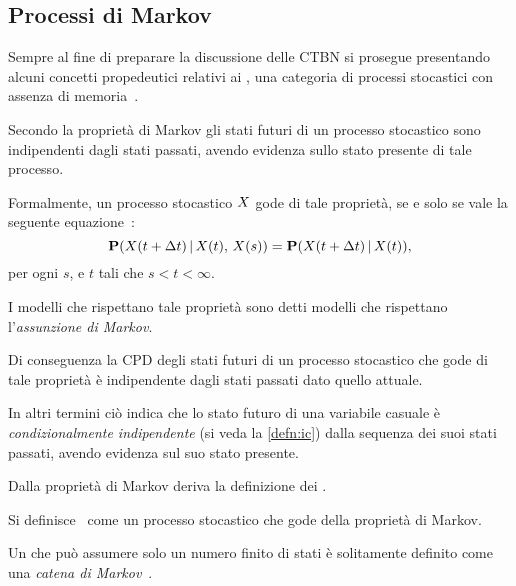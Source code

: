 \subsection{Processi di Markov}
\label{subsec:mps}

Sempre al fine di preparare la discussione delle \acl{CTBN} si prosegue presentando alcuni concetti propedeutici relativi ai \mprocess{}, una categoria di processi stocastici con assenza di memoria~\citep{Loeve1978}.

\begin{definizione}
\label{defn:markov-assumption}
Secondo la proprietà di Markov gli stati futuri di un processo stocastico sono indipendenti dagli stati passati, avendo evidenza sullo stato presente di tale processo.

Formalmente, un processo stocastico $\mathnormal{X}$ gode di tale proprietà, se e solo se vale la seguente equazione~\citep{Loeve1978}:
\begin{equation}
\label{eq:markov-assumption}
\mathbf{P}(\mathnormal{X}(t + \Delta t)\,\arrowvert\,\mathnormal{X}(t),\,\mathnormal{X}(s))=\mathbf{P}(\mathnormal{X}(t + \Delta t)\,\arrowvert\,\mathnormal{X}(t))\text{,}
\end{equation}
per ogni $s$, e $t$ tali che $s < t < \infty$.

I modelli che rispettano tale proprietà sono detti modelli che rispettano l'\emph{assunzione di Markov}.
\end{definizione}

Di conseguenza la \acl{CPD} degli stati futuri di un processo stocastico che gode di tale proprietà è indipendente dagli stati passati dato quello attuale.

In altri termini ciò indica che lo stato futuro di una variabile casuale è \emph{condizionalmente indipendente} (si veda la \autoref{defn:ic}) dalla sequenza dei suoi stati passati, avendo evidenza sul suo stato presente.

Dalla proprietà di Markov deriva la definizione dei \mprocess{}.

\begin{definizione}[\upcase\mprocess*{}]
Si definisce~\citep{Loeve1978} come \mprocess*{} un processo stocastico che gode della proprietà di Markov.
\end{definizione}

\begin{definizione}
Un \mprocess*{} che può assumere solo un numero finito di stati è solitamente definito come una \emph{catena di Markov}~\citep[si veda][10]{Norris1998}.
\end{definizione}

